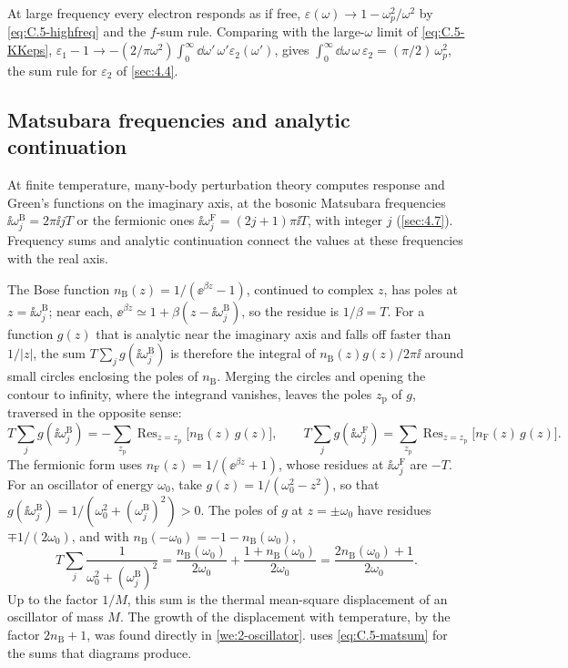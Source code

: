 At large frequency every electron responds as if free, $\varepsilon(\omega) \to 1 - \omega_p^2/\omega^2$ by \cref{eq:C.5-highfreq} and the $f$-sum rule. Comparing with the large-$\omega$ limit of \cref{eq:C.5-KKeps}, $\varepsilon_1 - 1 \to -(2/\pi\omega^2)\int_0^\infty\dd\omega'\,\omega'\varepsilon_2(\omega')$, gives $\int_0^\infty\dd\omega\,\omega\,\varepsilon_2 = (\pi/2)\,\omega_p^2$, the sum rule for $\varepsilon_2$ of \cref{sec:4.4}.

\subsection{Matsubara frequencies and analytic continuation}

At finite temperature, many-body perturbation theory computes response and Green's functions on the imaginary axis, at the bosonic Matsubara frequencies $\ii\omega^{\mathrm{B}}_j = 2\pi\ii jT$ or the fermionic ones $\ii\omega^{\mathrm{F}}_j = (2j + 1)\pi\ii T$, with integer $j$ (\cref{sec:4.7}). Frequency sums and analytic continuation connect the values at these frequencies with the real axis.

The Bose function $n_{\mathrm{B}}(z) = 1/(\ee^{\beta z} - 1)$, continued to complex $z$, has poles at $z = \ii\omega^{\mathrm{B}}_j$; near each, $\ee^{\beta z} \simeq 1 + \beta(z - \ii\omega^{\mathrm{B}}_j)$, so the residue is $1/\beta = T$. For a function $g(z)$ that is analytic near the imaginary axis and falls off faster than $1/|z|$, the sum $T\sum_jg(\ii\omega^{\mathrm{B}}_j)$ is therefore the integral of $n_{\mathrm{B}}(z)g(z)/2\pi\ii$ around small circles enclosing the poles of $n_{\mathrm{B}}$. Merging the circles and opening the contour to infinity, where the integrand vanishes, leaves the poles $z_{\mathrm{p}}$ of $g$, traversed in the opposite sense:
\begin{equation}
  T\sum_{j}g(\ii\omega^{\mathrm{B}}_j) = -\sum_{z_{\mathrm{p}}}\operatorname{Res}_{z = z_{\mathrm{p}}}\bigl[n_{\mathrm{B}}(z)\,g(z)\bigr], \qquad
  T\sum_{j}g(\ii\omega^{\mathrm{F}}_j) = \sum_{z_{\mathrm{p}}}\operatorname{Res}_{z = z_{\mathrm{p}}}\bigl[n_{\mathrm{F}}(z)\,g(z)\bigr] .
  \label{eq:C.5-matsum}
\end{equation}
The fermionic form uses $n_{\mathrm{F}}(z) = 1/(\ee^{\beta z} + 1)$, whose residues at $\ii\omega^{\mathrm{F}}_j$ are $-T$. For an oscillator of energy $\omega_0$, take $g(z) = 1/(\omega_0^2 - z^2)$, so that $g(\ii\omega^{\mathrm{B}}_j) = 1/(\omega_0^2 + (\omega^{\mathrm{B}}_j)^2) > 0$. The poles of $g$ at $z = \pm\omega_0$ have residues $\mp1/(2\omega_0)$, and with $n_{\mathrm{B}}(-\omega_0) = -1 - n_{\mathrm{B}}(\omega_0)$,
\begin{equation*}
  T\sum_j\frac{1}{\omega_0^2 + (\omega^{\mathrm{B}}_j)^2} = \frac{n_{\mathrm{B}}(\omega_0)}{2\omega_0} + \frac{1 + n_{\mathrm{B}}(\omega_0)}{2\omega_0} = \frac{2n_{\mathrm{B}}(\omega_0) + 1}{2\omega_0} .
\end{equation*}
Up to the factor $1/M$, this sum is the thermal mean-square displacement of an oscillator of mass $M$. The growth of the displacement with temperature, by the factor $2n_{\mathrm{B}} + 1$, was found directly in \cref{we:2-oscillator}.  uses \cref{eq:C.5-matsum} for the sums that diagrams produce.

